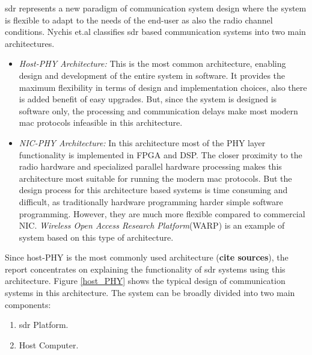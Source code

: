 \ac{sdr} represents a new paradigm of communication system design where the system is flexible to adapt to the needs of the end-user as also the radio channel conditions. Nychis et.al \cite{nychis_enabling_nodate} classifies \ac{sdr} based communication systems into two main architectures.
\begin{itemize} 
\item{\textit{Host-PHY Architecture:} This is the most common architecture, enabling design and development of the entire system in software.
It provides the maximum flexibility in terms of design and implementation choices, also there is added benefit of easy upgrades.
But, since the system is designed is software only, the processing and communication delays make most modern \ac{mac} protocols infeasible in this architecture.}


\item{\textit{NIC-PHY Architecture:} In this architecture most of the \ac{PHY} layer functionality is implemented in \ac{FPGA} and \ac{DSP}.
The closer proximity to the radio hardware and specialized parallel hardware processing makes this architecture most suitable for running the modern \ac{mac} protocols.
But the design process for this architecture based systems is time consuming and difficult, as traditionally hardware programming harder simple software programming.
However, they are much more flexible compared to commercial \ac{NIC}.
\textit{Wireless Open Access Research Platform}(WARP) \cite{noauthor_warp_nodate} is an example of system based on this type of architecture.}

\end{itemize}
Since host-PHY \cite{nychis_enabling_nodate} is the most commonly used architecture (\textbf{cite sources}), the report concentrates on explaining the functionality of \ac{sdr} systems using this architecture.
Figure \ref{host_PHY} shows the typical design of communication systems in this architecture. The system can be broadly divided into two main components:
\begin{enumerate}
\item{\ac{sdr} Platform.}
\item{Host Computer.}
\end{enumerate}


